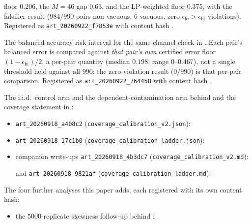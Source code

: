 \documentclass[sigconf,anonymous,review]{acmart}
\begin{document}
\begin{description}
  floor $0.206$, the $M{=}46$ gap $0.63$, and the LP-weighted floor $0.375$,
  with the falsifier result ($984/990$ pairs non-vacuous, $6$ vacuous, zero
  $\epsilon_{\mathrm{lo}} > \epsilon_{\mathrm{hi}}$ violations). Registered as
  \texttt{art\_20260922\_f7853e} with content hash
  \texttt{}.
  \item[Same-channel validation.] The balanced-accuracy risk interval for the
  same-channel check in . Each pair's
  balanced error is compared against \emph{that pair's own} certified error floor
  $(1-\epsilon_{\mathrm{hi}})/2$, a per-pair quantity (median $0.198$, range
  $0$--$0.467$), not a single threshold held against all $990$: the
  zero-violation result ($0/990$) is that per-pair comparison. Registered as
  \texttt{art\_20260922\_764458} with content hash
  \texttt{}.
  \item[Upper-side coverage calibration.] The i.i.d.\ control arm and the
  dependent-contamination arm behind  and the coverage
  statement in :
  \begin{itemize}
    \item \texttt{art\_20260918\_a408c2}
    (\texttt{coverage\_calibration\_v2.json}):
    \texttt{}
    \item \texttt{art\_20260918\_17c1b0}
    (\texttt{coverage\_calibration\_ladder.json}):
    \texttt{}
    \item companion write-ups \texttt{art\_20260918\_4b3dc7}
    (\texttt{coverage\_calibration\_v2.md}):
    {\raggedright\texttt{}\par}
    and \texttt{art\_20260918\_9821af}
    (\texttt{coverage\_calibration\_ladder.md}):
    {\raggedright\texttt{}\par}
  \end{itemize}
  \item[Analysis loads.] The four further analyses this paper adds,
  each registered with its own content hash:
  \begin{itemize}
    \item the $5000$-replicate skewness follow-up behind :

\end{itemize}
\end{description}
\end{document}
